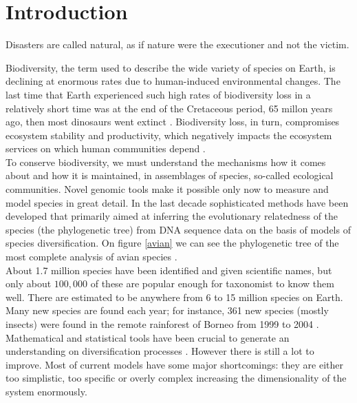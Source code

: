 \chapter{Introduction}
{\color{gray}
 \begin{fquote}  Disasters are called natural, as if nature were the executioner and not the victim. \end{fquote} }


Biodiversity, the term used to describe the wide variety of species on Earth, is declining at enormous rates due to human-induced environmental changes. The last time that Earth experienced such high rates of biodiversity loss in a relatively short time was at the end of the Cretaceous period, 65 millon years ago, then most dinosaurs went extinct \cite{wake2008we}. Biodiversity loss, in turn, compromises ecosystem stability and productivity, which negatively impacts the ecosystem services on which human communities depend \cite{tilman2006biodiversity}. \\





To conserve biodiversity, we must understand the mechanisms how it comes about and how it is maintained, in assemblages of species, so-called ecological communities. Novel genomic tools make it possible only now to measure and model species in great detail. In the last decade sophisticated methods have been developed that primarily aimed at inferring the evolutionary relatedness of the species (the phylogenetic tree) from DNA sequence data on the basis of models of species diversification. On figure \ref{avian} we can see the phylogenetic tree of the most complete analysis of avian species \cite{jetz2012global}.\\

About 1.7 million species have been identified and given scientific names, but only about $100,000$ of these are popular enough for taxonomist to know them well. There are estimated to be anywhere from 6 to 15 million species on Earth. Many new species are found each year; for instance, 361 new species (mostly insects) were found in the remote rainforest of Borneo from 1999 to 2004 \cite{chivian2008sustaining}. \\

Mathematical and statistical tools have been crucial to generate an understanding on diversification processes \cite{gillman2009introduction}. However there is still a lot to improve. Most of current models have some major shortcomings: they are either too simplistic, too specific or overly complex increasing the dimensionality of the system enormously.\\

